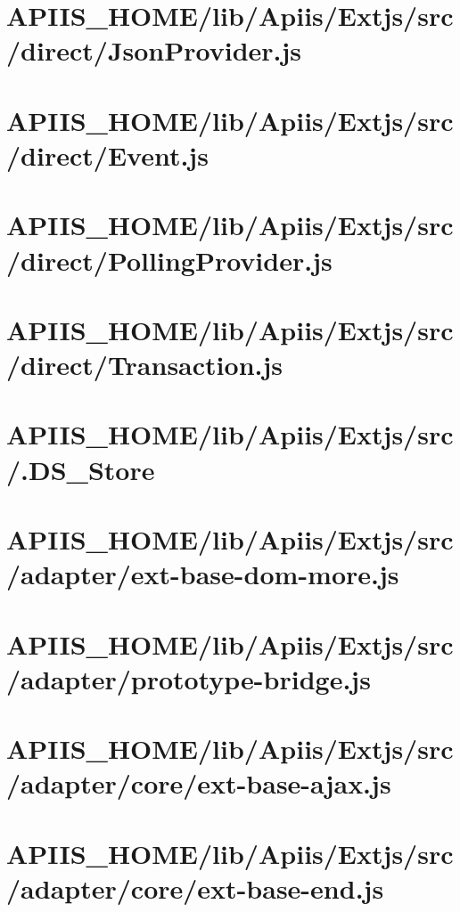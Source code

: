 \section{APIIS\_HOME/lib/Apiis/Extjs/src/direct/JsonProvider.js} 
\section{APIIS\_HOME/lib/Apiis/Extjs/src/direct/Event.js} 
\section{APIIS\_HOME/lib/Apiis/Extjs/src/direct/PollingProvider.js} 
\section{APIIS\_HOME/lib/Apiis/Extjs/src/direct/Transaction.js} 
\section{APIIS\_HOME/lib/Apiis/Extjs/src/.DS\_Store} 
\section{APIIS\_HOME/lib/Apiis/Extjs/src/adapter/ext-base-dom-more.js} 
\section{APIIS\_HOME/lib/Apiis/Extjs/src/adapter/prototype-bridge.js} 
\section{APIIS\_HOME/lib/Apiis/Extjs/src/adapter/core/ext-base-ajax.js} 
\section{APIIS\_HOME/lib/Apiis/Extjs/src/adapter/core/ext-base-end.js} 
